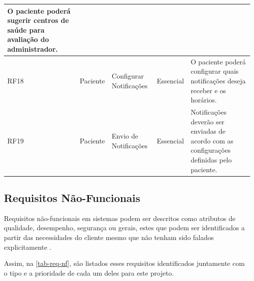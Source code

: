 \begin{quadro}[htb]
\begin{center}
\begin{tabular}{p{1.1cm}|p{1.3cm}|p{3.0cm}|p{1.5cm}|p{6.7cm}}
            O paciente poderá sugerir centros de saúde para avaliação do administrador.                                    \\
            \hline
            RF18            & Paciente        & Configurar Notificações         & Essencial           &
            O paciente poderá configurar quais notificações deseja receber e os horários.                                  \\
            \hline
            RF19            & Paciente        & Envio de Notificações           & Essencial           &
            Notificações deverão ser enviadas de acordo com as configurações definidas pelo paciente.                      \\
        \end{tabular}
    \end{center}
\end{quadro}

\newpage

\subsection{Requisitos Não-Funcionais}

Requisitos não-funcionais em sistemas podem ser descritos como atributos de qualidade, desempenho, segurança ou gerais, estes que podem
ser identificados a partir das necessidades do cliente mesmo que não tenham sido falados explicitamente \cite{pressman2014software}.

Assim, na \autoref{tab-req-nf}, são listados esses requisitos identificados juntamente com o tipo e a prioridade
de cada um deles para este projeto.

